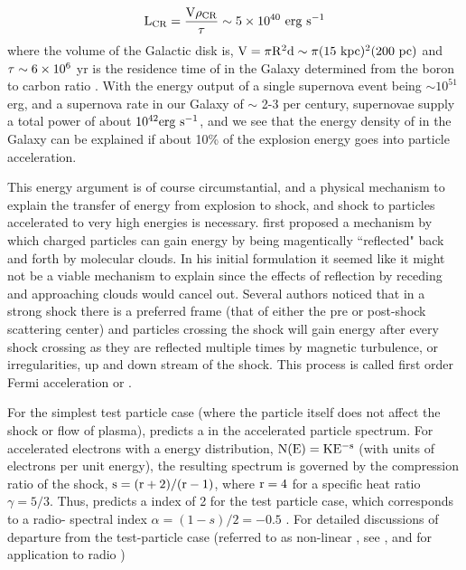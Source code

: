 \begin{equation}\label{eq:crLum}
\rm {L_{CR} = \frac{V\rho_{CR}}{\tau} \sim 5\times 10^{40}~erg~s^{-1}}
\end{equation}
where the volume of the Galactic disk is, ${\rm V = \pi R^2 d \sim  \pi (15~kpc)^2(200~pc)}$ and ${\rm \tau \sim 6\times 10^6}$ yr is the residence time of \crs{} in the Galaxy determined from the boron to carbon ratio \citep{Gaisser90}. With the energy output of a single supernova event being $\sim 10^{51}$ erg, and a supernova rate in our Galaxy of $\sim$ 2-3 per century, supernovae supply a total power of about ${\rm 10^{42} erg~s^{-1}}$, and we see that the energy density of \crs{} in the Galaxy can be explained if about 10\% of the explosion energy goes into particle acceleration.

This energy argument is of course circumstantial, and a physical mechanism to explain the transfer of energy from explosion to shock, and shock to particles accelerated to very high energies is necessary. \cite{Fermi49} first proposed a mechanism by which charged particles can  gain energy by being magentically ``reflected" back and forth by molecular clouds. In his initial formulation it seemed like it might not be a viable mechanism to explain \crs{} since the effects of reflection by receding and approaching clouds would cancel out. Several authors \citep[for example]{Bell78,Blandford78} noticed that in a strong shock there is a preferred frame (that of either the pre or post-shock scattering center) and particles crossing the shock will gain energy after every shock crossing as they are reflected multiple times by magnetic turbulence, or irregularities, up and down stream of the shock. This process is called first order Fermi acceleration or \dsa{}.

For the simplest test particle case (where the particle itself does not affect the shock or flow of plasma), \dsa{} predicts a \pl{} in the accelerated particle spectrum. For accelerated electrons with a \pl{} energy distribution, ${\rm N(E) = KE^{-s}}$ (with units of electrons per unit energy), the resulting \sync{} spectrum is governed by the compression ratio of the shock, ${\rm s = (r+2)/(r-1)} $, where ${\rm r = 4}$ for a specific heat ratio $\gamma = 5/3$\cite{}. Thus, \dsa{} predicts a \pl{} index of 2 for the test particle case, which corresponds to a radio-\sync{} spectral index $\alpha = (1-s)/2 = -0.5$   \citep[and Chapter \ref{gamAstr:Emiss} ]{Pacholczyk70}. For detailed discussions of departure from the test-particle case (referred to as non-linear \dsa{}, see \cite{Reynolds08},\cite{Malkov01} and \cite{Urosevic14} for application to radio \snrs{})


